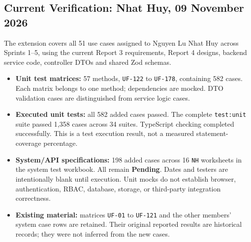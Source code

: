 \subsection{Current Verification: Nhat Huy, 09 November 2026}
The extension covers all 51 use cases assigned to Nguyen Lu Nhat Huy across Sprints 1--5, using the current Report 3 requirements, Report 4 designs, backend service code, controller DTOs and shared Zod schemas.

\begin{itemize}
\item \textbf{Unit test matrices:} 57 methods, \texttt{UF-122} to \texttt{UF-178}, containing 582 cases. Each matrix belongs to one method; dependencies are mocked. DTO validation cases are distinguished from service logic cases.
\item \textbf{Executed unit tests:} all 582 added cases passed. The complete \texttt{test:unit} suite passed 1,358 cases across 34 suites. TypeScript checking completed successfully. This is a test execution result, not a measured statement-coverage percentage.
\item \textbf{System/API specifications:} 198 added cases across 16 \texttt{NH} worksheets in the system test workbook. All remain \textbf{Pending}. Dates and testers are intentionally blank until execution. Unit mocks do not establish browser, authentication, RBAC, database, storage, or third-party integration correctness.
\item \textbf{Existing material:} matrices \texttt{UF-01} to \texttt{UF-121} and the other members' system case rows are retained. Their original reported results are historical records; they were not inferred from the new cases.
\end{itemize}

